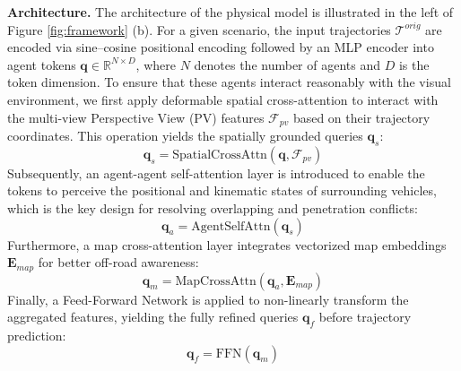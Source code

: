 \documentclass[runningheads]{llncs}
\begin{document}
\noindent \textbf{Architecture.} The architecture of the physical model is illustrated in the left of Figure \ref{fig:framework} (b). For a given scenario, the input trajectories $\mathcal{T}^{orig}$ are encoded via sine--cosine positional encoding followed by an MLP encoder into agent tokens $\mathbf{q} \in \mathbb{R}^{N \times D}$, where $N$ denotes the number of agents and $D$ is the token dimension. To ensure that these agents interact reasonably with the visual environment, we first apply deformable spatial cross-attention to interact with the multi-view Perspective View (PV) features $\mathcal{F}_{pv}$ based on their trajectory coordinates. This operation yields the spatially grounded queries $\mathbf{q}_{s}$:
\begin{equation}
    \mathbf{q}_{s} = \text{SpatialCrossAttn}(\mathbf{q}, \mathcal{F}_{pv})
\end{equation}
Subsequently, an agent-agent self-attention layer is introduced to enable the tokens to perceive the positional and kinematic states of surrounding vehicles, which is the key design for resolving overlapping and penetration conflicts:
\begin{equation}
    \mathbf{q}_{a} = \text{AgentSelfAttn}(\mathbf{q}_{s})
\end{equation}
Furthermore, a map cross-attention layer integrates vectorized map embeddings $\mathbf{E}_{map}$ for better off-road awareness:
\begin{equation}
    \mathbf{q}_{m} = \text{MapCrossAttn}(\mathbf{q}_{a}, \mathbf{E}_{map})
\end{equation}
Finally, a Feed-Forward Network is applied to non-linearly transform the aggregated features, yielding the fully refined queries $\mathbf{q}_{f}$ before trajectory prediction:
\begin{equation}
    \mathbf{q}_{f} = \text{FFN}(\mathbf{q}_{m})
\end{equation}
\end{document}
